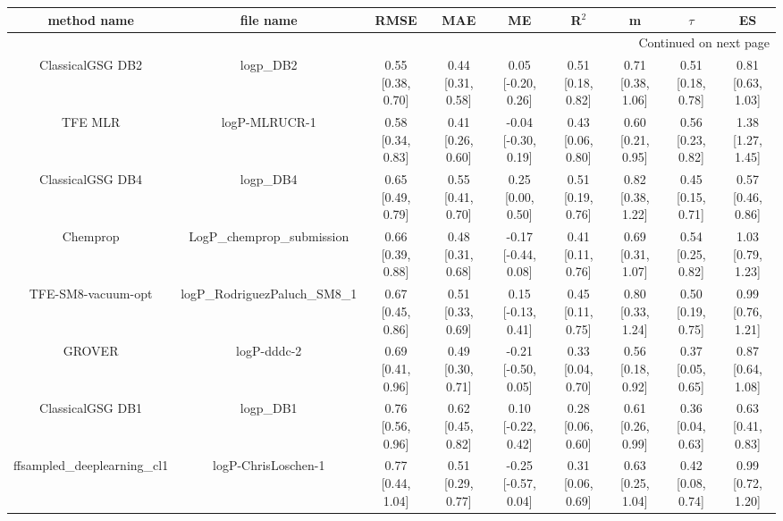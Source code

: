 \documentclass{article}
\begin{document}
\begin{center}
\scriptsize
\begin{longtable}{|ccccccccc|}
\toprule
                  method name &                                      file name &               RMSE &                MAE &                    ME &              R$^2$ &                     m &                $\tau$ &                    ES \\
\midrule
\endhead
\midrule
\multicolumn{9}{r}{{Continued on next page}} \\
\midrule
\endfoot

\bottomrule
\endlastfoot
             ClassicalGSG DB2 &                                      logp\_DB2 &  0.55 [0.38, 0.70] &  0.44 [0.31, 0.58] &    0.05 [-0.20, 0.26] &  0.51 [0.18, 0.82] &     0.71 [0.38, 1.06] &     0.51 [0.18, 0.78] &     0.81 [0.63, 1.03] \\
                      TFE MLR &                                  logP-MLRUCR-1 &  0.58 [0.34, 0.83] &  0.41 [0.26, 0.60] &   -0.04 [-0.30, 0.19] &  0.43 [0.06, 0.80] &     0.60 [0.21, 0.95] &     0.56 [0.23, 0.82] &     1.38 [1.27, 1.45] \\
             ClassicalGSG DB4 &                                      logp\_DB4 &  0.65 [0.49, 0.79] &  0.55 [0.41, 0.70] &     0.25 [0.00, 0.50] &  0.51 [0.19, 0.76] &     0.82 [0.38, 1.22] &     0.45 [0.15, 0.71] &     0.57 [0.46, 0.86] \\
                     Chemprop &                     LogP\_chemprop\_submission &  0.66 [0.39, 0.88] &  0.48 [0.31, 0.68] &   -0.17 [-0.44, 0.08] &  0.41 [0.11, 0.76] &     0.69 [0.31, 1.07] &     0.54 [0.25, 0.82] &     1.03 [0.79, 1.23] \\
           TFE-SM8-vacuum-opt &                  logP\_RodriguezPaluch\_SM8\_1 &  0.67 [0.45, 0.86] &  0.51 [0.33, 0.69] &    0.15 [-0.13, 0.41] &  0.45 [0.11, 0.75] &     0.80 [0.33, 1.24] &     0.50 [0.19, 0.75] &     0.99 [0.76, 1.21] \\
                       GROVER &                                    logP-dddc-2 &  0.69 [0.41, 0.96] &  0.49 [0.30, 0.71] &   -0.21 [-0.50, 0.05] &  0.33 [0.04, 0.70] &     0.56 [0.18, 0.92] &     0.37 [0.05, 0.65] &     0.87 [0.64, 1.08] \\
             ClassicalGSG DB1 &                                      logp\_DB1 &  0.76 [0.56, 0.96] &  0.62 [0.45, 0.82] &    0.10 [-0.22, 0.42] &  0.28 [0.06, 0.60] &     0.61 [0.26, 0.99] &     0.36 [0.04, 0.63] &     0.63 [0.41, 0.83] \\
   ffsampled_deeplearning_cl1 &                            logP-ChrisLoschen-1 &  0.77 [0.44, 1.04] &  0.51 [0.29, 0.77] &   -0.25 [-0.57, 0.04] &  0.31 [0.06, 0.69] &     0.63 [0.25, 1.04] &     0.42 [0.08, 0.74] &     0.99 [0.72, 1.20] \\

\end{longtable}
\end{center}
\end{document}
